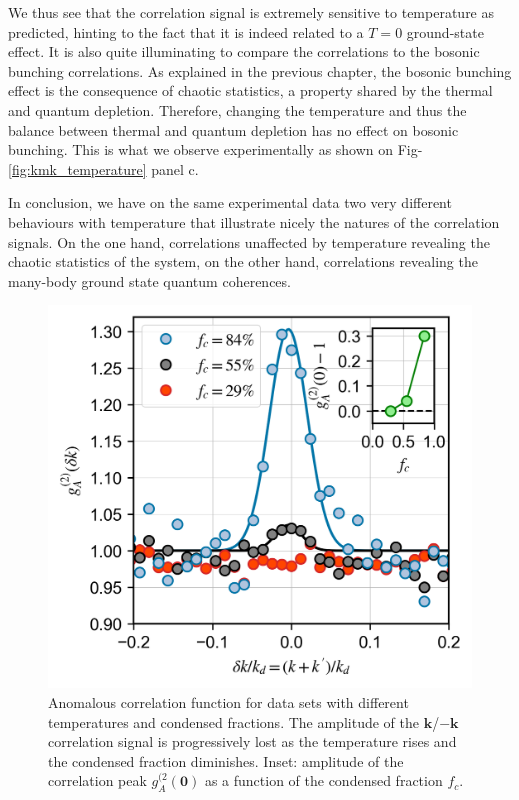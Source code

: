 We thus see that the \kmk correlation signal is extremely sensitive to temperature as predicted, hinting to the fact that it is indeed related to a $T=0$ ground-state effect. It is also quite illuminating to compare the \kmk correlations to the bosonic bunching \kk correlations. As explained in the previous chapter, the bosonic bunching effect is the consequence of chaotic statistics, a property shared by the thermal and quantum depletion. Therefore, changing the temperature and thus the balance between thermal and quantum depletion has no effect on bosonic bunching. This is what we observe experimentally as shown on Fig-\ref{fig:kmk_temperature} panel c.

In conclusion, we have on the same experimental data two very different behaviours with temperature that illustrate nicely the natures of the correlation signals. On the one hand, \kk correlations unaffected by temperature revealing the chaotic statistics of the system, on the other hand, \kmk correlations revealing the many-body ground state quantum coherences.

\begin{figure}
    \centering
    \includegraphics{Fig/Chapter4/kmk_3_temp.png}
    \caption{Anomalous correlation function for data sets with different temperatures and condensed fractions. The amplitude of the $\bm{k}$/$-\bm{k}$ correlation signal is progressively lost as the temperature rises and the condensed fraction diminishes. Inset: amplitude of the correlation peak $g^{(2}_{A}({\bm 0})$ as a function of the condensed fraction $f_c$.}
    \label{fig:kmk_3_temp}
\end{figure}




